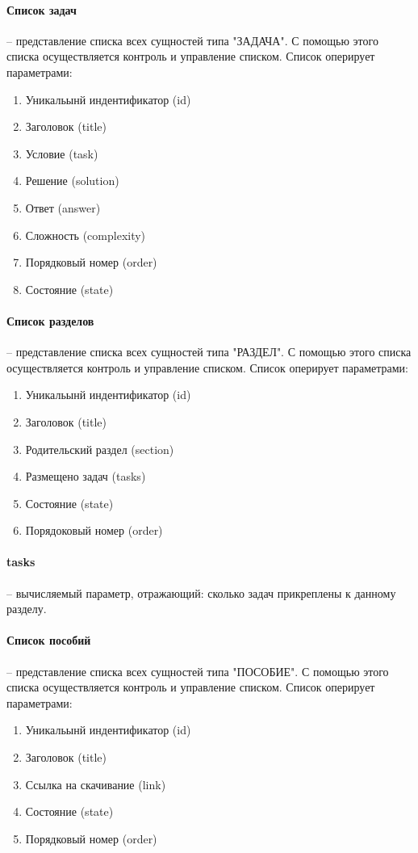 \paragraph{Список задач} -- представление списка всех сущностей типа "ЗАДАЧА". С помощью этого списка осуществляется контроль и управление списком.
Список оперирует параметрами:
\begin{enumerate}
  \item Уникальынй индентификатор (id)
  \item Заголовок (title)
  \item Условие (task)
  \item Решение (solution)
  \item Ответ (answer)
  \item Сложность (complexity)
  \item Порядковый номер (order)
  \item Состояние (state)
\end{enumerate}

\paragraph{Список разделов} -- представление списка всех сущностей типа "РАЗДЕЛ". С помощью этого списка осуществляется контроль и управление списком.
Список оперирует параметрами:
\begin{enumerate}
  \item Уникальынй индентификатор (id)
  \item Заголовок (title)
  \item Родительский раздел (section)
  \item Размещено задач (tasks)
  \item Состояние (state)
  \item Порядоковый номер (order)
\end{enumerate}
\paragraph{tasks} -- вычисляемый параметр, отражающий: сколько задач прикреплены к данному разделу.

\paragraph{Список пособий} -- представление списка всех сущностей типа "ПОСОБИЕ". С помощью этого списка осуществляется контроль и управление списком.
Список оперирует параметрами:
\begin{enumerate}
  \item Уникальынй индентификатор (id)
  \item Заголовок (title)
  \item Ссылка на скачивание (link)
  \item Состояние (state)
  \item Порядковый номер (order)
\end{enumerate}

